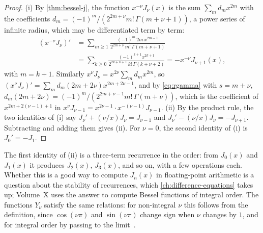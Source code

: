 \begin{proof}
(i) By \cref{thm:bessel-j}, the function $x^{-\nu}J_\nu(x)$ is the sum $\sum_md_mx^{2m}$ with the coefficients $d_m=(-1)^m/(2^{2m+\nu}m!\,\Gamma(m+\nu+1))$, a power series of infinite radius, which may be differentiated term by term:
\begin{align*}
(x^{-\nu}J_\nu)'&=\sum_{m\ge1}\frac{(-1)^m\,2m\,x^{2m-1}}{2^{2m+\nu}\,m!\,\Gamma(m+\nu+1)}\\
&=\sum_{k\ge0}\frac{(-1)^{k+1}x^{2k+1}}{2^{2k+\nu+1}\,k!\,\Gamma(k+\nu+2)}=-x^{-\nu}J_{\nu+1}(x),
\end{align*}
with $m=k+1$. Similarly $x^\nu J_\nu=x^{2\nu}\sum_md_mx^{2m}$, so $(x^\nu J_\nu)'=\sum_md_m(2m+2\nu)x^{2m+2\nu-1}$, and by \eqref{eq:rgamma} with $s=m+\nu$, $d_m(2m+2\nu)=(-1)^m/(2^{2m+\nu-1}m!\,\Gamma(m+\nu))$, which is the coefficient of $x^{2m+2(\nu-1)+1}$ in $x^{\nu}J_{\nu-1}=x^{2\nu-1}\cdot x^{-(\nu-1)}J_{\nu-1}$. (ii) By the product rule, the two identities of (i) say $J_\nu'+(\nu/x)J_\nu=J_{\nu-1}$ and $J_\nu'-(\nu/x)J_\nu=-J_{\nu+1}$. Subtracting and adding them gives (ii). For $\nu=0$, the second identity of (i) is $J_0'=-J_1$.
\end{proof}

The first identity of (ii) is a three-term recurrence in the order: from $J_0(x)$ and $J_1(x)$ it produces $J_2(x)$, $J_3(x)$, and so on, with a few operations each. Whether this is a good way to compute $J_n(x)$ in floating-point arithmetic is a question about the stability of recurrences, which \cref{ch:difference-equations} takes up; Volume~X uses the answer to compute Bessel functions of integral order. The functions $Y_\nu$ satisfy the same relations: for non-integral $\nu$ this follows from the definition, since $\cos(\nu\pi)$ and $\sin(\nu\pi)$ change sign when $\nu$ changes by $1$, and for integral order by passing to the limit~\cite[Chap.~III]{watson1944}.

